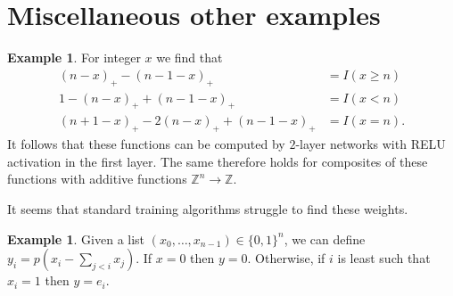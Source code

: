 \documentclass{amsart}
\newcommand{\Z}         {{\mathbb{Z}}}
\renewcommand{\:}{\colon}
\theoremstyle{definition}
\newtheorem{example}[theorem]{Example}
\begin{document}
\section{Miscellaneous other examples}

\begin{example}\label{eg-intervals}
 For integer $x$ we find that  
 \begin{align*}
  (n-x)_+ - (n-1-x)_+ &= I(x\geq n) \\
  1 - (n-x)_+ + (n-1-x)_+ &= I(x < n) \\
  (n+1-x)_+ - 2(n-x)_+ + (n-1-x)_+ &= I(x = n).
 \end{align*}
 It follows that these functions can be computed by $2$-layer networks
 with RELU activation in the first layer.  The same therefore holds
 for composites of these functions with additive functions
 $\Z^n\to\Z$.

 It seems that standard training algorithms struggle to find these
 weights. 
\end{example}

\begin{example}\label{eg-first}
 Given a list $(x_0,\dotsc,x_{n-1})\in\{0,1\}^n$, we can define
 $y_i=p\left(x_i-\sum_{j<i}x_j\right)$.  If $x=0$ then $y=0$.
 Otherwise, if $i$ is least such that $x_i=1$ then $y=e_i$.
\end{example}
\end{document}
